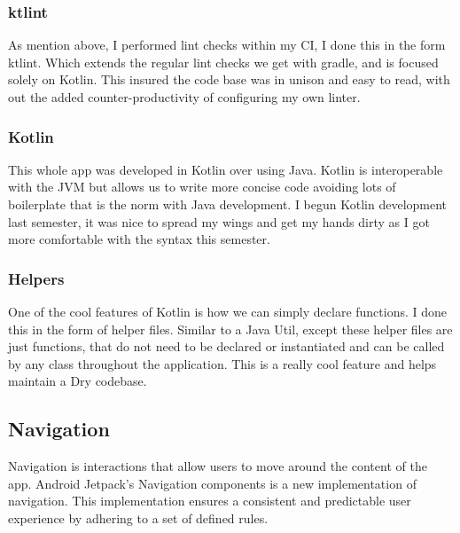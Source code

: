 \subsubsection{  ktlint }
As mention above, I performed lint checks within my CI, I done this in the form ktlint. Which extends the regular lint checks we get with gradle, and is focused solely on Kotlin. This insured the code base was in unison and easy to read, with out the added counter-productivity of configuring my own linter.

\subsubsection{  Kotlin }
This whole app was developed in Kotlin over using Java. Kotlin is interoperable with the JVM but allows us to write more concise code avoiding lots of boilerplate that is the norm with Java development. I begun Kotlin development last semester, it was nice to spread my wings and get my hands dirty as I got more comfortable with the syntax this semester.

\subsubsection{ Helpers }
One of the cool features of Kotlin is how we can simply declare functions. I done this in the form of helper files. Similar to a Java Util, except these helper files are just functions, that do not need to be declared or instantiated  and can be called by any class throughout the application. This is a really cool feature and helps maintain a Dry codebase.

\clearpage
\subsection{Navigation}
Navigation is interactions that allow users to move around the content of the app. Android Jetpack's Navigation components is a new implementation of navigation. This implementation ensures a consistent and predictable user experience by adhering to a set of defined rules.

